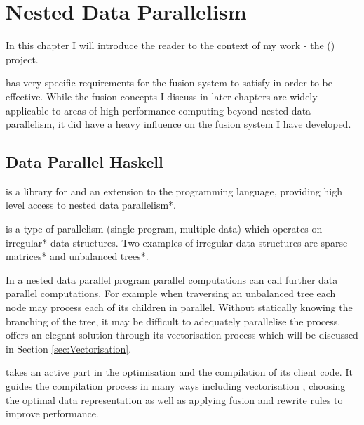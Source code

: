\documentclass[preamble.tex]{subfiles}
\begin{document}
\clearpage

\chapter{Nested Data Parallelism}

In this chapter I will introduce the reader to the context of my work - the  (\DPH) project\idph{}.

\DPH has very specific requirements for the fusion system to satisfy in order to be effective. While the fusion concepts I discuss in later chapters are widely applicable to areas of high performance computing beyond nested data parallelism, it did have a heavy influence on the fusion system I have developed.


\section{Data Parallel Haskell}
\label{sec:DPH}

\idph{} is a library for and an extension to the \Haskell programming language, providing high level access to \*nested data parallelism*.

 is a type of  parallelism (single program, multiple data) which operates on \*irregular* data structures. Two examples of irregular data structures are \*sparse matrices* and \*unbalanced trees*.

In a nested data parallel program parallel computations can call further data parallel computations. For example when traversing an unbalanced tree each node may process each of its children in parallel. Without statically knowing the branching of the tree, it may be difficult to adequately parallelise the process. \DPH offers an elegant solution through its vectorisation process which will be discussed in Section \ref{sec:Vectorisation}.

\DPH takes an active part in the optimisation and the compilation of its client code. It guides the compilation process in many ways including vectorisation \cite{PLKC08}, choosing the optimal data representation \cite{CDL09} as well as applying fusion \cite{CLP+07} and rewrite rules \cite{PTH01} to improve performance.
\end{document}
